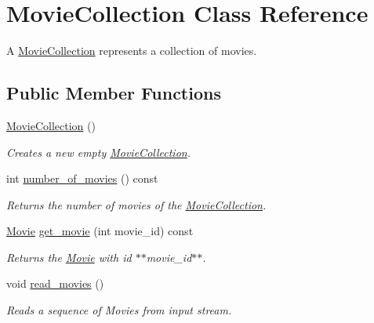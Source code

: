 \hypertarget{class_movie_collection}{
\section{MovieCollection Class Reference}
\label{class_movie_collection}
}


A \hyperlink{class_movie_collection}{MovieCollection} represents a collection of movies.  


\subsection*{Public Member Functions}
\begin{DoxyCompactItemize}
\item 
\hyperlink{class_movie_collection_ab17a3e99d78262f0c1d290a1c7385e0f}{MovieCollection} ()
\begin{DoxyCompactList}\small\item\em Creates a new empty \hyperlink{class_movie_collection}{MovieCollection}. \item\end{DoxyCompactList}\item 
int \hyperlink{class_movie_collection_adfa021fecab47a7db69fad7ffc7dd1c3}{number\_\-of\_\-movies} () const 
\begin{DoxyCompactList}\small\item\em Returns the number of movies of the \hyperlink{class_movie_collection}{MovieCollection}. \item\end{DoxyCompactList}\item 
\hyperlink{class_movie}{Movie} \hyperlink{class_movie_collection_af5558ab369dd58dd9294326ea854007c}{get\_\-movie} (int movie\_\-id) const 
\begin{DoxyCompactList}\small\item\em Returns the \hyperlink{class_movie}{Movie} with id $\ast$$\ast$movie\_\-id$\ast$$\ast$. \item\end{DoxyCompactList}\item 
void \hyperlink{class_movie_collection_aefcb7765d0cfd43e4c55feda3abb5e55}{read\_\-movies} ()
\begin{DoxyCompactList}\small\item\em Reads a sequence of Movies from input stream. \item\end{DoxyCompactList}\end{DoxyCompactItemize}


